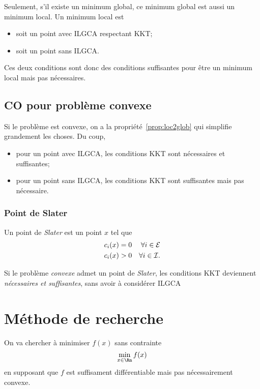 Seulement, s'il existe un minimum global, ce minimum global
est aussi un minimum local.
Un minimum local est
\begin{itemize}
  \item soit un point avec ILGCA respectant KKT;
  \item soit un point sans ILGCA.
\end{itemize}
Ces deux conditions sont donc des conditions suffisantes pour être un minimum
local mais pas nécessaires.

\subsection{CO pour problème convexe}
Si le problème est convexe, on a la propriété~\ref{prop:loc2glob}
qui simplifie grandement les choses.
Du coup,
\begin{itemize}
  \item pour un point avec ILGCA,
    les conditions KKT sont nécessaires et suffisantes;
  \item pour un point sans ILGCA,
    les conditions KKT sont suffisantes mais pas nécessaire.
\end{itemize}

\subsubsection{Point de Slater}
Un point de \emph{Slater} est un point $x$ tel que
\begin{align*}
  c_i(x) & = 0 & \forall i \in \mathcal{E}\\
  c_i(x) & > 0 & \forall i \in \mathcal{I}.
\end{align*}

Si le problème \emph{convexe} admet un point de \emph{Slater},
les conditions KKT deviennent \emph{nécessaires et suffisantes},
sans avoir à considérer ILGCA

\section{Méthode de recherche}
On va chercher à minimiser $f(x)$ sans contrainte
\[ \min_{x \in \Rn} f(x) \]
en supposant que $f$ est suffisament différentiable
mais pas nécessairement convexe.

